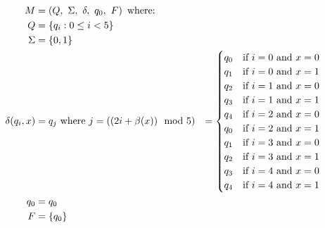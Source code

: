 \begin{Answer}
  \begin{align*}
    M &= \left( Q,\ \Sigma,\ \delta,\ q_0,\ F \right) \text{ where: }\\
    Q &= \left\{q_i : 0 \le i < 5\right\}\\
    \Sigma &= \left\{0, 1\right\}\\
    \delta(q_i, x) &= q_j \text{ where } j = ((2i + \beta(x)) \mod 5)
    &= \begin{cases}
      q_0 & \text{if } i = 0 \text{ and } x = 0\\
      q_1 & \text{if } i = 0 \text{ and } x = 1\\
      q_2 & \text{if } i = 1 \text{ and } x = 0\\
      q_3 & \text{if } i = 1 \text{ and } x = 1\\
      q_4 & \text{if } i = 2 \text{ and } x = 0\\
      q_0 & \text{if } i = 2 \text{ and } x = 1\\
      q_1 & \text{if } i = 3 \text{ and } x = 0\\
      q_2 & \text{if } i = 3 \text{ and } x = 1\\
      q_3 & \text{if } i = 4 \text{ and } x = 0\\
      q_4 & \text{if } i = 4 \text{ and } x = 1
    \end{cases}\\
    q_0 &= q_0\\
    F &= \left\{q_0\right\}
  \end{align*}

\end{Answer}
